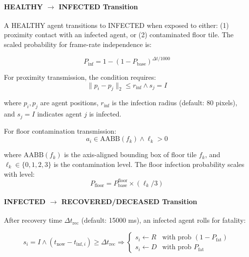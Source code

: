 \paragraph{HEALTHY $\to$ INFECTED Transition}

A HEALTHY agent transitions to INFECTED when exposed to either: (1) proximity contact with an infected agent, or (2) contaminated floor tile. The scaled probability for frame-rate independence is:

\begin{equation}
\label{eq:infection-prob}
P_{\text{inf}} = 1 - (1 - P_{\text{base}})^{\Delta t / 1000}
\end{equation}

For proximity transmission, the condition requires:
\begin{equation}
\label{eq:proximity-cond}
\|p_i - p_j\|_2 \leq r_{\text{inf}} \land s_j = I
\end{equation}

where $p_i, p_j$ are agent positions, $r_{\text{inf}}$ is the infection radius (default: 80 pixels), and $s_j = I$ indicates agent $j$ is infected.

For floor contamination transmission:
\begin{equation}
\label{eq:floor-cond}
a_i \in \text{AABB}(f_k) \land \ell_k > 0
\end{equation}

where $\text{AABB}(f_k)$ is the axis-aligned bounding box of floor tile $f_k$, and $\ell_k \in \{0, 1, 2, 3\}$ is the contamination level. The floor infection probability scales with level:
\begin{equation}
\label{eq:floor-prob}
P_{\text{floor}} = P_{\text{base}}^{\text{floor}} \times (\ell_k / 3)
\end{equation}

\paragraph{INFECTED $\to$ RECOVERED/DECEASED Transition}

After recovery time $\Delta t_{\text{rec}}$ (default: 15000 ms), an infected agent rolls for fatality:

\begin{equation}
\label{eq:fatality-cond}
s_i = I \land (t_{\text{now}} - t_{\text{inf},i}) \geq \Delta t_{\text{rec}} \Rightarrow 
\begin{cases}
s_i \leftarrow R & \text{with prob } (1 - P_{\text{fat}})\\
s_i \leftarrow D & \text{with prob } P_{\text{fat}}
\end{cases}
\end{equation}

